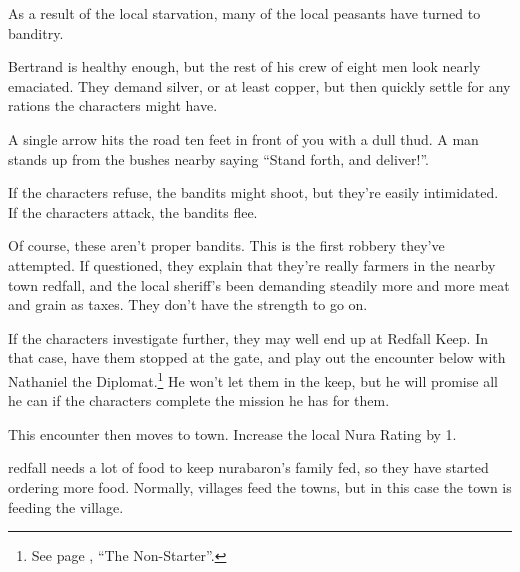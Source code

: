 \begin{multicols}{2}
As a result of the local starvation, many of the local peasants have turned to banditry.


Bertrand is healthy enough, but the rest of his crew of eight men look nearly emaciated.
They demand silver, or at least copper, but then quickly settle for any rations the characters might have.

\begin{boxtext}

	A single arrow hits the road ten feet in front of you with a dull thud.
	A man stands up from the bushes nearby saying ``Stand forth, and deliver!''.

\end{boxtext}

If the characters refuse, the bandits might shoot, but they're easily intimidated.  If the characters attack, the bandits flee.

Of course, these aren't proper bandits.
This is the first robbery they've attempted.
If questioned, they explain that they're really farmers in the nearby town \gls{redfall}, and the local sheriff's been demanding steadily more and more meat and grain as taxes.
They don't have the strength to go on.



If the characters investigate further, they may well end up at Redfall Keep.
In that case, have them stopped at the gate, and play out the encounter below with Nathaniel the Diplomat.\footnote{See page \pageref{nonstarter}, ``The Non-Starter''.}
He won't let them in the keep, but he will promise all he can if the characters complete the mission he has for them.

This encounter then moves to town.
Increase the local Nura Rating by 1.


\Gls{redfall} needs a lot of food to keep \gls{nurabaron}'s family fed, so they have started ordering more food.
Normally, villages feed the towns, but in this case the town is feeding the village.


\end{multicols}
